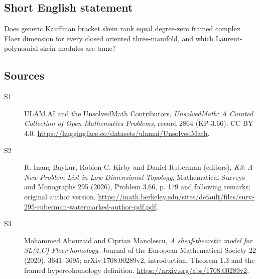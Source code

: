 \documentclass[11pt]{article}
\begin{document}
\subsection{Short English statement}
Does generic Kauffman bracket skein rank equal degree-zero framed complex Floer dimension for every closed oriented three-manifold, and which Laurent-polynomial skein modules are tame?
\subsection{Sources}
\begin{description}
\item[\hypertarget{source:2864:1}{S1}] ULAM.AI and the UnsolvedMath Contributors, \emph{UnsolvedMath: A Curated Collection of Open Mathematics Problems}, record 2864 (KP-3.66). CC BY 4.0. \url{https://huggingface.co/datasets/ulamai/UnsolvedMath}.
\item[\hypertarget{source:2864:2}{S2}] R. İnanç Baykur, Robion C. Kirby and Daniel Ruberman (editors), \emph{K3: A New Problem List in Low-Dimensional Topology}, Mathematical Surveys and Monographs 295 (2026), Problem 3.66, p. 179 and following remarks; original author version. \url{https://math.berkeley.edu/sites/default/files/surv-295-ruberman-watermarked-author-pdf.pdf}.
\item[\hypertarget{source:2864:3}{S3}] Mohammed Abouzaid and Ciprian Manolescu, \emph{A sheaf-theoretic model for SL(2,C) Floer homology}, Journal of the European Mathematical Society 22 (2020), 3641--3695; arXiv:1708.00289v2, introduction, Theorem 1.3 and the framed hypercohomology definition. \url{https://arxiv.org/abs/1708.00289v2}.
\end{description}
\label{end:2864}
\end{document}
